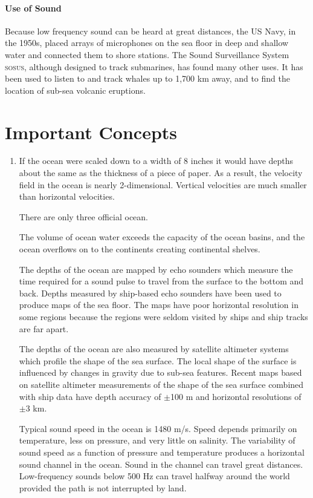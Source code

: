 \paragraph{Use of Sound}
Because low frequency sound can be heard at great
distances, the US Navy, in the 1950s, placed arrays of microphones on
the sea floor in deep and shallow water and connected them to shore
stations. The Sound Surveillance System \textsc{sosus}, although
designed to track submarines, has found many other uses. It has been
used to listen to and track whales up to 1,700 km away, and to find
the location of sub-sea volcanic eruptions.

\section{Important Concepts}
\begin{enumerate}
\item If the ocean were scaled down to a width of 8 inches it would
  have depths about the same as the thickness of a piece of paper. As
  a result, the velocity field in the ocean is nearly
  2-dimensional. Vertical velocities are much smaller than horizontal
  velocities.

\vitem There are only three official ocean.

\vitem The volume of ocean water exceeds the capacity of the ocean
basins, and the ocean overflows on to the continents creating
continental shelves.

\vitem The depths of the ocean are mapped by echo sounders which
measure the time required for a sound pulse to travel from the surface to the bottom and
back. Depths measured by ship-based echo sounders have been used to
produce maps of the sea floor. The maps have poor horizontal
resolution in some regions because the regions were seldom visited by
ships and ship tracks are far apart.

\vitem The depths of the ocean are also measured by satellite
altimeter systems which profile the shape of the sea surface. The
local shape of the surface is influenced by changes in gravity due to
sub-sea features. Recent maps based on satellite altimeter
measurements of the shape of the sea surface combined with ship data
have depth accuracy of $ \pm $100 m and horizontal resolutions of $
\pm $3 km.

\vitem Typical sound speed in the ocean is
1480 m/s. Speed depends primarily on temperature, less on pressure,
and very little on salinity. The variability of sound speed as a
function of pressure and temperature produces a horizontal sound
channel in the ocean. Sound in the channel can travel great distances.
Low-frequency sounds below 500 Hz can travel halfway around the world
provided the path is not interrupted by land.
\end{enumerate}


